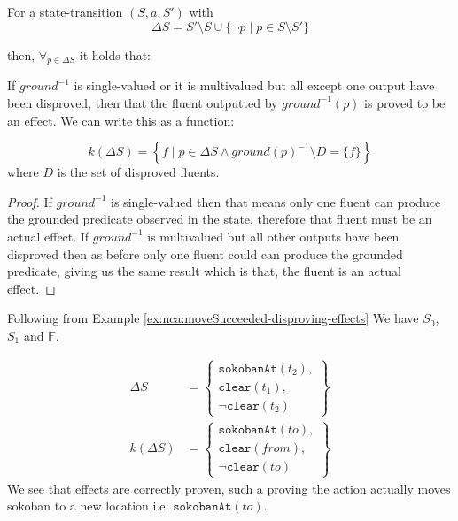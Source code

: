 \documentclass[../Master.tex]{subfiles}
\begin{document}
\begin{theorem} For a state-transition $(S,a,S')$ with 
	\begin{equation*}
	\Delta S = S' \setminus S \cup \{\neg p \mid  p \in S \setminus S' \}
	\end{equation*}
	
	then, 
	 $\forall_{p \in \Delta S}$ it holds that:
	
	If $ground^{-1}$ is single-valued or it is multivalued but all except one output have been disproved, then that the fluent outputted by $ground^{-1}(p)$ is proved to be an effect.
	We can write this as a function:
	
	\begin{equation*}
	k(\Delta S) = 
	\left\{
		f \mid 
				p \in \Delta S \land 
				ground(p)^{-1} \setminus D = \{f\}
		\right\}
	\end{equation*}
	where $D$ is the set of disproved fluents.
	
	\begin{proof}
		If $ground^{-1}$ is single-valued then that means only one fluent can produce the grounded predicate observed in the state, therefore that fluent must be an actual effect.
		If $ground^{-1}$ is multivalued but all other outputs have been disproved then as before only one fluent could can produce the grounded predicate, giving us the same result which is that, the fluent is an actual effect.
	\end{proof}
\end{theorem}

\begin{example} \label{ex:nca:moveSucceeded-proving-effects}
	Following from Example \ref{ex:nca:moveSucceeded-disproving-effects}
	We have $S_0$, $S_1$ and $\mathbb{F}$.
	
	\begin{equation*}
	\begin{split}
	\Delta S &=
	\left\{
	\begin{gathered}
	\texttt{sokobanAt}(t_2), \\
	\texttt{clear}(t_1), \\
	\neg \texttt{clear}(t_2)		
	\end{gathered}
	\right\} \\	
	k(\Delta S) &= \left\{
	\begin{gathered}
	\texttt{sokobanAt}(to), \\
	\texttt{clear}(from), \\
	\neg \texttt{clear}(to)		
	\end{gathered}
	\right\}
	\end{split}
	\end{equation*}
	We see that effects are correctly proven, such a proving the action actually moves sokoban to a new location i.e. $\texttt{sokobanAt}(to)$.
\end{example}
\end{document}
